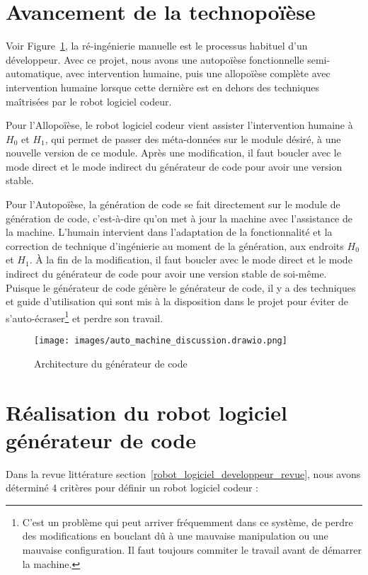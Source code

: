 \section{Avancement de la technopoïèse}\label{avancement_technopoiese}
Voir Figure~\ref{fig:dia_auto_machine_discussion}, la ré-ingénierie manuelle est le processus habituel d'un développeur. Avec ce projet, nous avons une autopoïèse fonctionnelle semi-automatique, avec intervention humaine, puis une allopoïèse complète avec intervention humaine lorsque cette dernière est en dehors des techniques maîtrisées par le robot logiciel codeur.

Pour l'Allopoïèse, le robot logiciel codeur vient assister l'intervention humaine à $H_0$ et $H_1$, qui permet de passer des méta-données sur le module désiré, à une nouvelle version de ce module. Après une modification, il faut boucler avec le mode direct et le mode indirect du générateur de code pour avoir une version stable.

Pour l'Autopoïèse, la génération de code se fait directement sur le module de génération de code, c'est-à-dire qu'on met à jour la machine avec l'assistance de la machine. L'humain intervient dans l'adaptation de la fonctionnalité et la correction de technique d'ingénierie au moment de la génération, aux endroits $H_0$ et $H_1$. À la fin de la modification, il faut boucler avec le mode direct et le mode indirect du générateur de code pour avoir une version stable de soi-même. Puisque le générateur de code génère le générateur de code, il y a des techniques et guide d'utilisation qui sont mis à la disposition dans le projet pour éviter de s'auto-écraser\footnote{C'est un problème qui peut arriver fréquemment dans ce système, de perdre des modifications en bouclant dû à une mauvaise manipulation ou une mauvaise configuration. Il faut toujours commiter le travail avant de démarrer la machine.} et perdre son travail.

\begin{figure}
\centering
\texttt{[image: images/auto\_machine\_discussion.drawio.png]}
\caption{Architecture du générateur de code}
\label{fig:dia_auto_machine_discussion}
\end{figure}


\section{Réalisation du robot logiciel générateur de code}
Dans la revue littérature section~\ref{robot_logiciel_developpeur_revue}, nous avons déterminé 4 critères pour définir un robot logiciel codeur :
